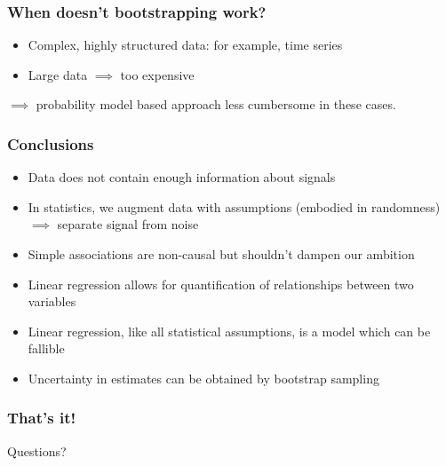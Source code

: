 \documentclass[handout]{beamer}
\begin{document}
\begin{frame}
	\frametitle{When doesn't bootstrapping work?}
	
	\begin{itemize}
		\item Complex, highly structured data: for example, time series
		\item Large data $\implies$ too expensive
	\end{itemize}
	
	$\implies$ probability model based approach less cumbersome in these cases.
	
\end{frame}

\begin{frame}
	\frametitle{Conclusions}
	
	\begin{itemize}
		\item Data does not contain enough information about signals
		\item In statistics, we augment data with assumptions (embodied in randomness) $\implies$ separate signal from noise
		\item Simple associations are non-causal but shouldn't dampen our ambition
		\item Linear regression allows for quantification of relationships between two variables
		\item Linear regression, like all statistical assumptions, is a model which can be fallible
		\item Uncertainty in estimates can be obtained by bootstrap sampling
	\end{itemize}
	
\end{frame}

\begin{frame}
	\frametitle{That's it!}
	
	\Large Questions?
\end{frame}
\end{document}
